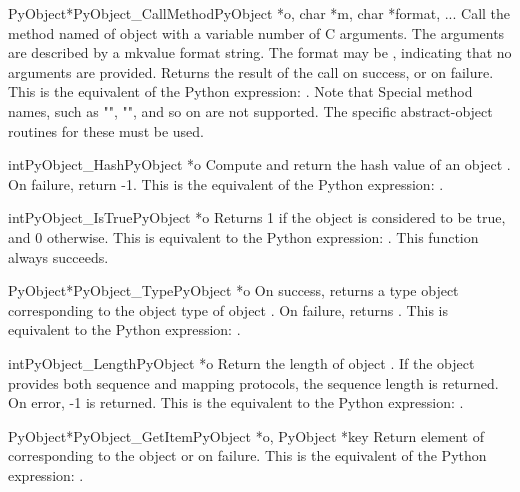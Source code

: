 \documentclass[twoside,openright]{report}
\begin{document}
\begin{cfuncdesc}{PyObject*}{PyObject_CallMethod}{PyObject *o, char *m, char *format, ...}
Call the method named  of object  with a variable number of
C arguments.  The \C{} arguments are described by a mkvalue
format string.  The format may be \NULL{}, indicating that no
arguments are provided. Returns the result of the call on
success, or \NULL{} on failure.  This is the equivalent of the
Python expression: .
Note that Special method names, such as "",
"", and so on are not supported. The specific
abstract-object routines for these must be used.
\end{cfuncdesc}


\begin{cfuncdesc}{int}{PyObject_Hash}{PyObject *o}
Compute and return the hash value of an object .  On
failure, return -1.  This is the equivalent of the Python
expression: .
\end{cfuncdesc}


\begin{cfuncdesc}{int}{PyObject_IsTrue}{PyObject *o}
Returns 1 if the object  is considered to be true, and
0 otherwise. This is equivalent to the Python expression:
.
This function always succeeds.
\end{cfuncdesc}


\begin{cfuncdesc}{PyObject*}{PyObject_Type}{PyObject *o}
On success, returns a type object corresponding to the object
type of object . On failure, returns \NULL{}.  This is
equivalent to the Python expression: .
\end{cfuncdesc}

\begin{cfuncdesc}{int}{PyObject_Length}{PyObject *o}
Return the length of object .  If the object  provides
both sequence and mapping protocols, the sequence length is
returned. On error, -1 is returned.  This is the equivalent
to the Python expression: .
\end{cfuncdesc}


\begin{cfuncdesc}{PyObject*}{PyObject_GetItem}{PyObject *o, PyObject *key}
Return element of  corresponding to the object  or \NULL{}
on failure. This is the equivalent of the Python expression:
.
\end{cfuncdesc}
\end{document}
